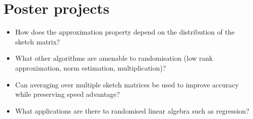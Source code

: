 \section{Poster projects}
\begin{itemize}
\item[1. ] How does the approximation property depend on the distribution of the sketch matrix?


\item[2. ] What other algorithms are amenable to randomisation (low rank approximation, norm estimation, multiplication)?


\item[3. ] Can averaging over multiple sketch matrices be used to improve accuracy while preserving speed advantage?


\item[4. ] What applications are there to randomised linear algebra such as regression?

\end{itemize}

